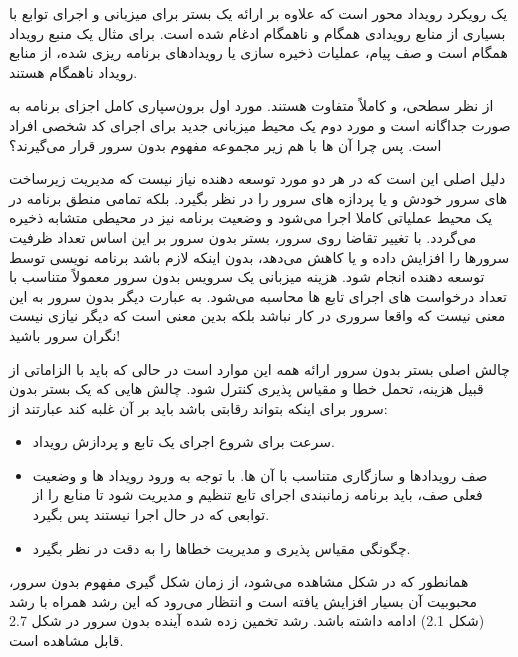  یک رویکرد رویداد محور است که علاوه بر ارائه یک بستر برای میزبانی و اجرای توابع با بسیاری از منابع رویدادی همگام و ناهمگام ادغام شده است. برای مثال  یک منبع رویداد همگام است و صف پیام، عملیات ذخیره سازی یا رویدادهای برنامه ریزی شده، از منابع رویداد ناهمگام هستند.

از نظر سطحی،  و  کاملاً متفاوت هستند. مورد اول برون‌سپاری کامل اجزای برنامه به صورت جداگانه است و مورد  دوم یک محیط میزبانی جدید برای اجرای کد شخصی افراد است. پس چرا آن ها با هم زیر مجموعه مفهوم بدون سرور قرار می‌گیرند؟

دلیل اصلی این است که در هر دو مورد توسعه دهنده نیاز نیست که مدیریت زیرساخت های سرور خودش و یا پردازه های سرور را در نظر بگیرد. بلکه تمامی منطق برنامه در یک محیط عملیاتی کاملا  اجرا می‌شود و وضعیت برنامه نیز در محیطی متشابه ذخیره می‌گردد. با تغییر تقاضا روی سرور، بستر بدون سرور بر این اساس تعداد ظرفیت سرورها را افزایش داده و یا کاهش می‌دهد، بدون اینکه لازم باشد برنامه نویسی توسط توسعه دهنده انجام شود. هزینه میزبانی یک سرویس بدون سرور معمولاً متناسب با تعداد درخواست های اجرای تابع ها محاسبه می‌شود. به عبارت دیگر بدون سرور به این معنی نیست که واقعا سروری در کار نباشد بلکه بدین معنی است که دیگر نیازی نیست نگران سرور باشید!

چالش اصلی بستر بدون سرور ارائه همه این موارد است در حالی که باید با الزاماتی از قبیل هزینه، تحمل خطا و مقیاس پذیری کنترل شود. چالش هایی که یک بستر بدون سرور برای اینکه بتواند رقابتی باشد باید بر آن غلبه کند عبارتند از:

\begin{itemize}
	
	\item سرعت برای شروع اجرای یک تابع و پردازش رویداد.
	
	\item صف رویدادها و سازگاری متناسب با آن ها. با توجه به ورود رویداد ها و وضعیت فعلی صف، باید برنامه زمانبندی اجرای تابع تنظیم و مدیریت شود تا منابع را از توابعی که در حال اجرا نیستند پس بگیرد.
	
	\item چگونگی مقیاس پذیری و مدیریت خطاها را به دقت در نظر بگیرد.
	
\end{itemize}

همانطور که در شکل مشاهده می‌شود، از زمان شکل گیری مفهوم بدون سرور، محبوبیت آن بسیار افزایش یافته است و انتظار می‌رود که این رشد همراه با رشد  (شکل 2.1) ادامه داشته باشد. رشد تخمین زده شده آینده بدون سرور در شکل 2.7 قابل مشاهده است.

